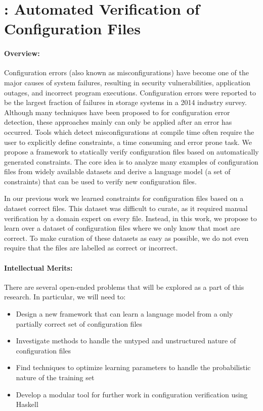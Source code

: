 \section*{\app: Automated Verification of Configuration Files}
\paragraph{Overview:} 
Configuration errors (also known as misconfigurations) have become one of the major causes of system failures, resulting in security vulnerabilities, application outages, and incorrect program executions. 
Configuration errors were reported to be the largest fraction of failures in storage systems in a 2014 industry survey. 
Although many techniques have been proposed to for configuration error detection, these approaches mainly can only be applied after an error has occurred.
Tools which detect misconfigurations at compile time often require the user to explicitly define constraints, a time consuming and error prone task.
We propose a framework to statically verify configuration files based on automatically generated constraints.
The core idea is to analyze many examples of configuration files from widely available datasets and derive a language model (a set of constraints) that can be used to verify new configuration files.

In our previous work we learned constraints for configuration files based on a dataset correct files.
This dataset was difficult to curate, as it required manual verification by a domain expert on every file.
Instead, in this work, we propose to learn over a dataset of configuration files where we only know that most are correct.
To make curation of these datasets as easy as possible, we do not even require that the files are labelled as correct or incorrect.


\paragraph{Intellectual Merits:} There are several open-ended problems that will be explored as a part of this research. In particular, we will need to:

\begin{itemize}
\item Design a new framework that can learn a language model from a only partially correct set of configuration files
\item Investigate methods to handle the untyped and unstructured nature of configuration files
\item Find techniques to optimize learning parameters to handle the probabilistic nature of the training set
\item Develop a modular tool for further work in configuration verification using Haskell
\end{itemize}

